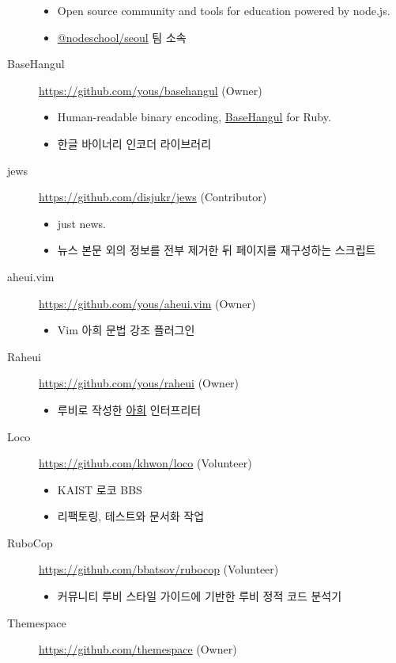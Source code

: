 \documentclass[a4paper,10pt]{article}
\begin{document}
\begin{description}
\begin{itemize}
      \item Open source community and tools for education powered by node.js.
      \item \href{https://github.com/orgs/nodeschool/teams/seoul}{@nodeschool/seoul} 팀 소속
    \end{itemize}
  \item[BaseHangul] \url{https://github.com/yous/basehangul} (Owner)
    \begin{itemize}
      \item Human-readable binary encoding, \href{https://basehangul.github.io}{BaseHangul} for Ruby.
      \item 한글 바이너리 인코더 라이브러리
    \end{itemize}
  \item[jews] \url{https://github.com/disjukr/jews} (Contributor)
    \begin{itemize}
      \item just news.
      \item 뉴스 본문 외의 정보를 전부 제거한 뒤 페이지를 재구성하는 스크립트
    \end{itemize}
  \item[aheui.vim] \url{https://github.com/yous/aheui.vim} (Owner)
    \begin{itemize}
      \item Vim 아희 문법 강조 플러그인
    \end{itemize}
  \item[Raheui] \url{https://github.com/yous/raheui} (Owner)
    \begin{itemize}
      \item 루비로 작성한 \href{http://aheui.github.io}{아희} 인터프리터
    \end{itemize}
  \item[Loco] \url{https://github.com/khwon/loco} (Volunteer)
    \begin{itemize}
      \item KAIST 로코 BBS
      \item 리팩토링, 테스트와 문서화 작업
    \end{itemize}
  \item[RuboCop] \url{https://github.com/bbatsov/rubocop} (Volunteer)
    \begin{itemize}
      \item 커뮤니티 루비 스타일 가이드에 기반한 루비 정적 코드 분석기
    \end{itemize}
  \item[Themespace] \url{https://github.com/themespace} (Owner)

\end{description}
\end{document}
